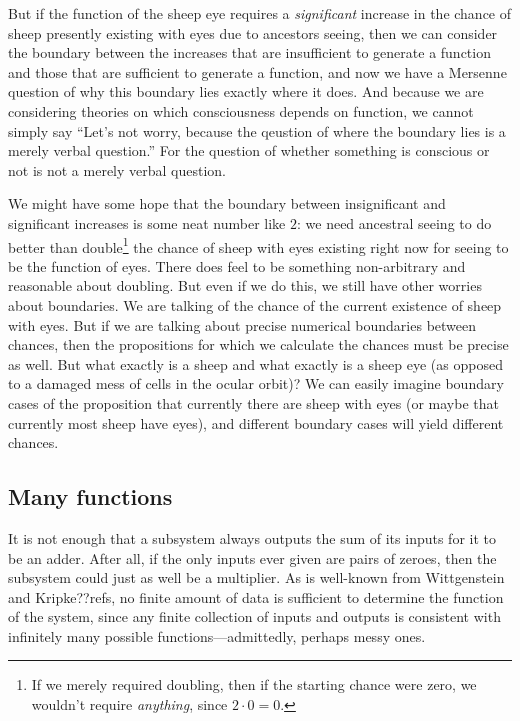 But if the function of the sheep eye requires a \textit{significant} increase in the chance of sheep presently existing 
with eyes due to ancestors seeing, then we can consider the boundary between the increases that are insufficient to generate a function and those that 
are sufficient to generate a function, and now we have a Mersenne question of why this boundary lies exactly where it does. And because
we are considering theories on which consciousness depends on function, we cannot simply say ``Let's not worry, because the 
qeustion of where the boundary lies is a merely verbal question.'' For the question of whether something is conscious or not 
is not a merely verbal question. 

We might have some hope that the boundary between insignificant and significant increases is some neat number like $2$: we 
need ancestral seeing to do better than double\footnote{If we merely required doubling, then if the starting chance were 
zero, we wouldn't require \textit{anything}, since $2\cdot 0=0$.} the chance of sheep with eyes existing right now for 
seeing to be the function of eyes. There does feel to be something non-arbitrary and reasonable about doubling. But even 
if we do this, we still have other worries about boundaries. We are talking of the chance of the current existence of sheep 
with eyes. But if we are talking about precise numerical boundaries between chances, then the propositions for which we 
calculate the chances must be precise as well. But what exactly is a sheep and what exactly is a sheep eye (as opposed to 
a damaged mess of cells in the ocular orbit)? We can easily 
imagine boundary cases of the proposition that currently there are sheep with eyes (or maybe that currently most sheep have
eyes), and different boundary cases will yield different chances. 

\subsection{Many functions}
It is not enough that a subsystem always outputs the sum of its inputs for it to be an adder. After all, if the only inputs ever
given are pairs of zeroes, then the subsystem could just as well be a multiplier. As is well-known from Wittgenstein and Kripke??refs,
no finite amount of data is sufficient to determine the function of the system, since any finite collection of inputs and outputs is
consistent with infinitely many possible functions---admittedly, perhaps messy ones.

